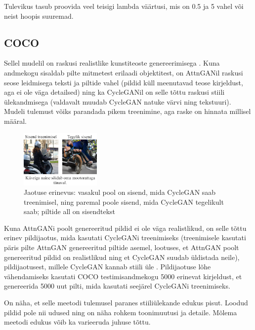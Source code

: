 \documentclass{vilgym}
\begin{document}
	Tulevikus tasub proovida veel teisigi lambda väärtusi, mis on 0.5 ja 5 vahel või neist hoopis suuremad.

	\subsection{COCO}

	Sellel mudelil on raskusi realistlike kunstiteoste genereerimisega . Kuna andmekogu sisaldab pilte mitmetest erilaadi objektitest, on AttnGANil raskusi seose leidmisega teksti ja piltide vahel (pildid küll meenutavad teose kirjeldust, aga ei ole väga detailsed) ning ka CycleGANil on selle tõttu raskusi stiili ülekandmisega (valdavalt muudab CycleGAN natuke värvi ning tekstuuri). Mudeli tulemust võiks parandada pikem treenimine, aga raske on hinnata millisel määral.

	\begin{figure}
		\includegraphics[width=0.35\textwidth]{images/distribution.png}
		\caption{Jaotuse erinevus: vasakul pool on sisend, mida CycleGAN saab treenimisel, ning paremal poole sisend, mida CycleGAN tegelikult saab; piltide all on sisendtekst}
		\label{fig:dist}
	\end{figure}

	Kuna AttnGANi poolt genereeritud pildid ei ole väga realistlikud, on selle tõttu erinev pildijaotus, mida kasutati \mbox{CycleGANi} treenimiseks (treenimisele kasutati päris pilte AttnGAN genereeritud piltide asemel, lootuses, et AttnGAN poolt genereeritud pildid on realistlikud ning et CycleGAN suudab üldistada neile), pildijaotusest, millele CycleGAN kannab stiili üle . Pildijaotuse lõhe vähendamiseks kasutati COCO testimisandmekogu 5000 erinevat kirjeldust, et genereerida 5000 uut pilti, mida kasutati seejärel CycleGANi treenimiseks.

	On näha, et selle meetodi tulemusel paranes stiiliülekande edukus pisut. Loodud pildid pole nii udused ning on näha rohkem toonimuutusi ja detaile. Mõlema meetodi edukus võib ka varieeruda juhuse tõttu.
\end{document}
